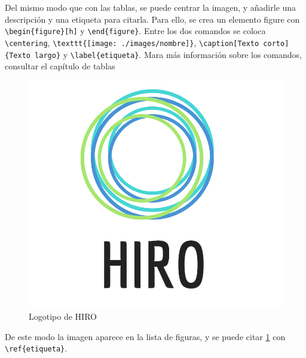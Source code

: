 Del mismo modo que con las tablas, se puede centrar la imagen, y añadirle una descripción y una etiqueta para citarla. Para ello, se crea un elemento figure con \verb!\begin{figure}[h]! y \verb!\end{figure}!. Entre los dos comandos se coloca \verb!\centering!, \verb!\texttt{[image: ./images/nombre]}!, \verb!\caption[Texto corto]{Texto largo}! y \verb!\label{etiqueta}!. Mara más información sobre los comandos, consultar el capítulo de tablas

\begin{figure}[H]
	\centering
	\includegraphics[scale=0.25]{./images/HIRO}
	\caption[HIRO logo]{Logotipo de HIRO}
	\label{hiro_logo}
\end{figure}

De este modo la imagen aparece en la lista de figuras, y se puede citar \ref{hiro_logo} con \verb!\ref{etiqueta}!.